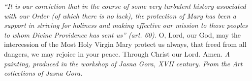 \pagestyle{empty}
\hspace{0pt}
\vfill

\textit{``It is our conviction that in the course of some very turbulent history associated with our Order (of which there is no lack),
the protection of Mary has been a support in striving for holiness
and making effective our mission to those peoples to whom Divine
Providence has sent us'' (art. 60).}
\medbreak
O, Lord, our God, may the intercession of the Most Holy
Virgin Mary protect us always, that freed from all dangers, we may
rejoice in your peace. Through Christ our Lord. Amen.
\vfill
\textit{A painting,
produced in the workshop of Jasna Gora, XVII century. From the
Art collections of Jasna Gora.}
\hspace{0pt}
\newpage
